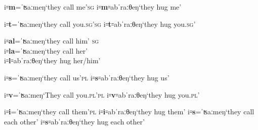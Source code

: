 \documentclass[output=paper,colorlinks,citecolor=brown]{langscibook}
\begin{document}
\begin{exe}
		\ex\label{preverbal}
			\begin{xlist}
				\ex 
                        \begin{xlisti}
                           \ex i꞊\textbf{m}=ˈʦaːmeŋ\tab `they call me'\textsc{sg}
                           \ex i꞊\textbf{m}꞊abˈraːθeŋ\tab `they hug me'
                        \end{xlisti}
                        
                    \ex
                        \begin{xlisti}
                           \ex  i꞊\textbf{t}=ˈʦaːmeŋ\tab `they call you.\textsc{sg}'\textsc{sg}
                           \ex i꞊\textbf{t}꞊abˈraːθeŋ\tab `they hug you.\textsc{sg}'
                        \end{xlisti}
                        
                    \ex 
                        \begin{xlisti}
                            \ex \label{aclgender} i꞊\textbf{al}=ˈʦaːmeŋ\tab `they call him' \textsc{sg}\\
                            i꞊\textbf{la}=ˈʦaːmeŋ\tab `they call her'\\
                            \ex \label{aclgenderleveled}  i꞊\textbf{l}꞊abˈraːθeŋ\tab `they hug her/him'
                        \end{xlisti}
                        
                    \ex 
                        \begin{xlisti}
                           \ex i꞊\textbf{s}=ˈʦaːmeŋ\tab `they call us'\textsc{pl}
                           \ex i꞊\textbf{s}꞊abˈraːθeŋ\tab `they hug us'
                        \end{xlisti}

                    \ex 
                        \begin{xlisti}
                            \ex i꞊\textbf{v}=ˈʦaːmeŋ\tab `They call you.\textsc{pl}'\textsc{pl}
                            \ex i꞊\textbf{v}꞊abˈraːθeŋ\tab `they hug you.\textsc{pl}'
                        \end{xlisti}

                    \ex
                        \begin{xlisti}
                            \ex i꞊\textbf{i}=ˈʦaːmeŋ\tab `they call them'\textsc{pl}
                            \ex i꞊\textbf{i}꞊abˈraːθeŋ\tab `they hug them'
                            \ex i꞊\textbf{s}=ˈʦaːmeŋ\tab `they call each other'
                            \ex i꞊\textbf{s}꞊abˈraːθeŋ\tab `they hug each other'
                        \end{xlisti}


\end{xlist}
\end{exe}
\end{document}
